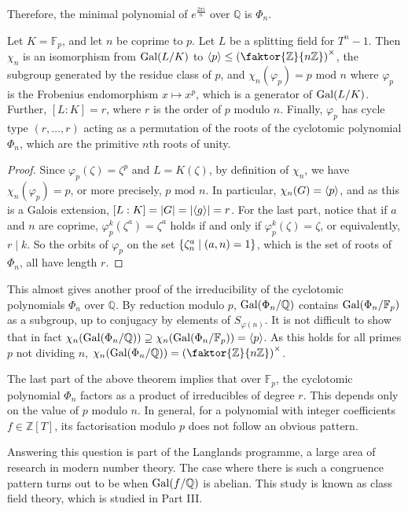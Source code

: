 Therefore, the minimal polynomial of \( e^{\frac{2\pi i}{n}} \) over \( \mathbb Q \) is \( \Phi_n \).
\begin{theorem}
	Let \( K = \mathbb F_p \), and let \( n \) be coprime to \( p \).
	Let \( L \) be a splitting field for \( T^n - 1 \).
	Then \( \chi_n \) is an isomorphism from \( \operatorname{Gal}(L/K) \) to \( \genset{p} \leq \qty(\faktor{\mathbb Z}{n\mathbb Z})^\times \), the subgroup generated by the residue class of \( p \), and \( \chi_n(\varphi_p) = p \text{ mod } n \) where \( \varphi_p \) is the Frobenius endomorphism \( x \mapsto x^p \), which is a generator of \( \operatorname{Gal}(L/K) \).
	Further, \( [L:K] = r \), where \( r \) is the order of \( p \) modulo \( n \).
	Finally, \( \varphi_p \) has cycle type \( (r,\dots,r) \) acting as a permutation of the roots of the cyclotomic polynomial \( \Phi_n \), which are the primitive \( n \)th roots of unity.
\end{theorem}
\begin{proof}
	Since \( \varphi_p(\zeta) = \zeta^p \) and \( L = K(\zeta) \), by definition of \( \chi_n \), we have \( \chi_n(\varphi_p) = p \), or more precisely, \( p \text{ mod } n \).
	In particular, \( \chi_n(G) = \left\langle{} p \right\rangle \), and as this is a Galois extension, \( [L:K] = \abs{G} = \abs{\left\langle{} g \right\rangle} = r \).
	For the last part, notice that if \( a \) and \( n \) are coprime, \( \varphi_p^k(\zeta^a) = \zeta^a \) holds if and only if \( \varphi_p^k(\zeta) = \zeta \), or equivalently, \( r \mid k \).
	So the orbits of \( \varphi_p \) on the set \( \qty{\zeta_n^a \mid (a,n) = 1} \), which is the set of roots of \( \Phi_n \), all have length \( r \).
\end{proof}
\begin{remark}
	This almost gives another proof of the irreducibility of the cyclotomic polynomials \( \Phi_n \) over \( \mathbb Q \).
	By reduction modulo \( p \), \( \operatorname{Gal}(\Phi_n/\mathbb Q) \) contains \( \operatorname{Gal}(\Phi_n/\mathbb F_p) \) as a subgroup, up to conjugacy by elements of \( S_{\varphi(n)} \).
	It is not difficult to show that in fact \( \chi_n(\operatorname{Gal}(\Phi_n/\mathbb Q)) \supseteq \chi_n(\operatorname{Gal}(\Phi_n/\mathbb F_p)) = \left\langle{} p \right\rangle \).
	As this holds for all primes \( p \) not dividing \( n \), \( \chi_n(\Gal(\Phi_n/\mathbb Q)) = \qty(\faktor{\mathbb Z}{n\mathbb Z})^\times \).
\end{remark}
\begin{remark}
	The last part of the above theorem implies that over \( \mathbb F_p \), the cyclotomic polynomial \( \Phi_n \) factors as a product of irreducibles of degree \( r \).
	This depends only on the value of \( p \) modulo \( n \).
	In general, for a polynomial with integer coefficients \( f \in \mathbb Z[T] \), its factorisation modulo \( p \) does not follow an obvious pattern.

	Answering this question is part of the Langlands programme, a large area of research in modern number theory.
	The case where there is such a congruence pattern turns out to be when \( \operatorname{Gal}(f/\mathbb Q) \) is abelian.
	This study is known as class field theory, which is studied in Part III.
\end{remark}

